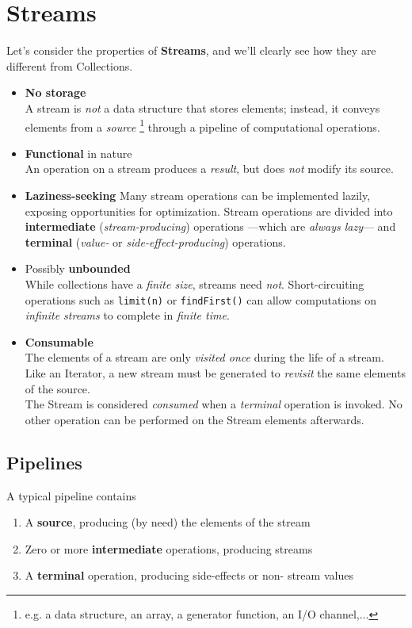 \chapter{Streams}
Let's consider the properties of \textbf{Streams}, and we'll clearly see how they are different from Collections.
\begin{itemize}
   
   \item \textbf{No storage}\\
   A stream is \textit{not} a data structure that
   stores elements; instead, it conveys elements
   from a \textit{source} \footnote{e.g. a data structure, an array, a
   generator function, an I/O channel,...} through a
   pipeline of computational operations.
   \item \textbf{Functional} in nature\\
   An operation on a stream produces a \textit{result}, but does \textit{not} modify its source.
   \item \textbf{Laziness-seeking}
   Many stream operations can be
   implemented lazily, exposing opportunities for optimization.
   Stream operations are divided into \textbf{intermediate} 
   (\textit{stream-producing}) operations {---}which are \textit{always lazy}{---} and
   \textbf{terminal}
   (\textit{value- }or \textit{side-effect-producing}) operations.
   \item Possibly \textbf{unbounded}\\
   While collections have a \textit{finite size}, streams need \textit{not}.
   Short-circuiting operations such as \lstinline|limit(n)| or
   \lstinline|findFirst()| can allow computations on \textit{infinite streams} to
   complete in \textit{finite time}.
   \item \textbf{Consumable}\\
   The elements of a stream are only \textit{visited once}
   during the life of a stream. 
   Like an Iterator, a new stream must be generated to \textit{revisit} the same elements of the source.\\
   The Stream is considered \textit{consumed} when a \textit{terminal}
   operation is invoked. 
   No other operation can be performed on
   the Stream elements afterwards.
\end{itemize} 
\section{Pipelines}

A typical pipeline contains
\begin{enumerate}
   \item A \textbf{source}, producing (by need) the elements of the stream
   \item Zero or more \textbf{intermediate} operations, producing streams
   \item A \textbf{terminal} operation, producing side-effects or non-
   stream values
\end{enumerate}

